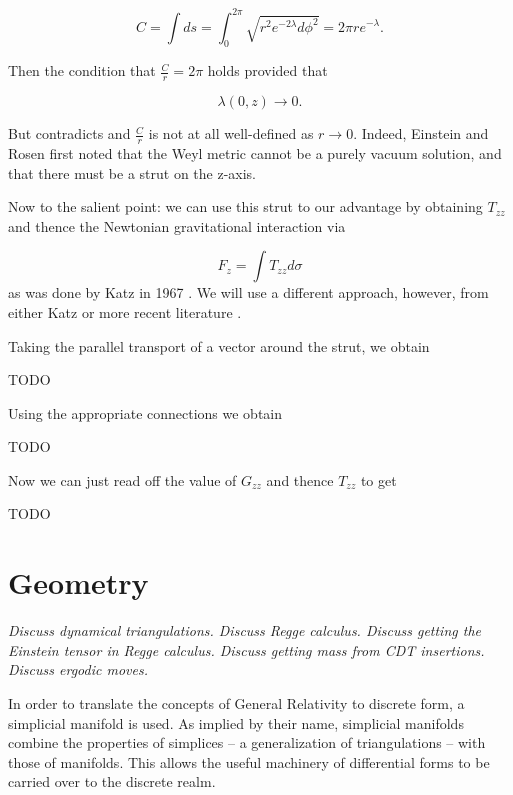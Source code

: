 \documentclass[12pt]{article}
\begin{document}
\begin{equation}
  \label{eq:phi-hat-length}
  C=\int ds =
  \int_0^{2\pi}\sqrt{r^2e^{-2\lambda}d\phi^2}={2\pi re^{-\lambda}}.
\end{equation}

Then the condition that $\frac{C}{r}=2\pi$ holds provided that

\begin{equation}
	\label{eq:lambda-elem-flat}
	\lambda(0,z)\rightarrow 0.
\end{equation} 

But  contradicts  and $\frac{C}{r}$ is not at all well-defined as $r\rightarrow 0$. Indeed, Einstein and Rosen \cite{einstein-rosen-1936} first noted that the Weyl metric cannot be a purely vacuum solution, and that there must be a strut on the z-axis.

Now to the salient point: we can use this strut to our advantage by obtaining $T_{zz}$ and thence the Newtonian gravitational interaction via

\begin{equation}
	\label{eq:F_z}
	F_{z}=\int T_{zz}d\sigma
\end{equation}
as was done by Katz in 1967 \cite{katz1967derivation}. We will use a different approach, however, from either Katz or more recent literature \cite{letelier_superposition_1997}.

Taking the parallel transport of a vector around the strut, we obtain

TODO

Using the appropriate connections we obtain

TODO

Now we can just read off the value of $G_{zz}$ and thence $T_{zz}$ to get

TODO

\section{Geometry}

\textit{Discuss dynamical triangulations. Discuss Regge calculus. Discuss getting the Einstein tensor in Regge calculus. Discuss getting mass from CDT insertions. Discuss ergodic moves.}

In order to translate the concepts of General Relativity to discrete form, a simplicial manifold is used. As implied by their name, simplicial manifolds combine the properties of simplices -- a generalization of triangulations -- with those of manifolds. This allows the useful machinery of differential forms to be carried over to the discrete realm.
\end{document}
